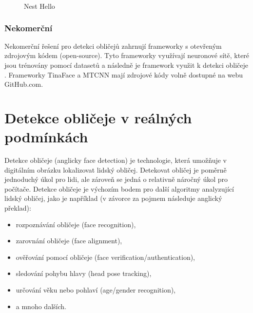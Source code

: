 \begin{figure}[H]
  \begin{center}
  \label{nest}
  \caption{Nest Hello \cite{securityCamsWeb2}}
  \end{center}
\end{figure}

\subsection*{Nekomerční}
Nekomerční řešení pro detekci obličejů zahrnují frameworky s otevřeným zdrojovým
kódem (open-source). Tyto frameworky využívají neuronové sítě, které jsou trénovány
pomocí datasetů a následně je framework využit k detekci obličeje 
\cite{faceRecognitionFrameworks}.
Frameworky TinaFace \cite{TinaFace} a MTCNN \cite{MTCNN} mají zdrojové kódy
volně dostupné na webu GitHub.com.






\chapter{Detekce obličeje v reálných podmínkách}
\label{kapitola:detekce_obličeje}
Detekce obličeje (anglicky face detection) \cite{fdReview, frReview} je technologie, která umožňuje v digitálním obrázku lokalizovat lidský obličej. 
Detekovat obličej je poměrně jednoduchý úkol pro lidi, ale zároveň se jedná o relativně náročný úkol pro počítače.
Detekce obličeje je výchozím bodem pro další algoritmy analyzující lidský obličej, jako je například (v závorce za pojmem následuje anglický překlad):
\begin{itemize}
  \item rozpoznávání obličeje (face recognition),
  \item zarovnání obličeje (face alignment),
  \item ověřování pomocí obličeje (face verification/authentication),
  \item sledování pohybu hlavy (head pose tracking),
  \item určování věku nebo pohlaví (age/gender recognition),
  \item[] a mnoho dalších. 
\end{itemize}

